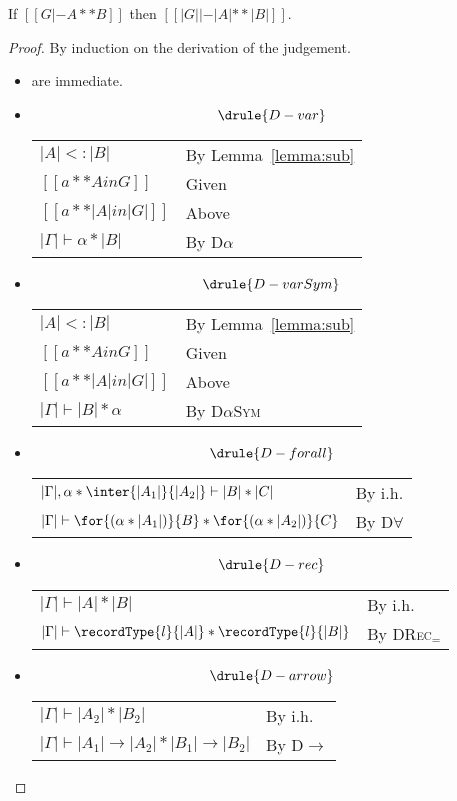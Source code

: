 \begin{lemma} \label{lemma:dis}
  If $[[G |- A ** B]]$ then $[[ |G| |- |A| ** |B| ]]$.
\end{lemma}
\begin{proof}
  By induction on the derivation of the judgement.
  \begin{itemize}
  \item {} are immediate.
  \item \[ \drule{D-var} \]
    \begin{longtable}[l]{ll}
      $|A| <: |B|$ & By Lemma~\ref{lemma:sub} \\
      $[[a ** A in G]]$ & Given \\
      $[[a ** |A| in |G|]]$ & Above \\
      $|\Gamma| \vdash \alpha * |B|$ & By \textsc{D$\alpha$}
    \end{longtable}
  \item \[ \drule{D-varSym} \]
    \begin{longtable}[l]{ll}
      $|A| <: |B|$ & By Lemma~\ref{lemma:sub} \\
      $[[a ** A in G]]$ & Given \\
      $[[a ** |A| in |G|]]$ & Above \\
      $|\Gamma| \vdash |B| * \alpha$ & By \textsc{D$\alpha$Sym}
    \end{longtable}
  \item \[ \drule{D-forall}  \]
    \begin{longtable}[l]{ll}
      $|\Gamma|, \alpha * \inter{|A_1|}{|A_2|} \vdash |B| * |C|$ & By i.h. \\
      $|\Gamma| \vdash \for{(\alpha * |A_1|)}{B} * \for{(\alpha * |A_2|)}{C}$ & By \textsc{D$\forall$}
    \end{longtable}
  \item \[ \drule{D-rec}  \]
    \begin{longtable}[l]{ll}
      $|\Gamma| \vdash |A| * |B| $ & By i.h. \\
      $|\Gamma| \vdash \recordType{l}{|A|} * \recordType{l}{|B|}$ & By \textsc{DRec$_=$}
    \end{longtable}
  \item \[ \drule{D-arrow}  \]
    \begin{longtable}[l]{ll}
      $|\Gamma| \vdash |A_2| * |B_2| $ & By i.h. \\
      $|\Gamma| \vdash |A_1| \rightarrow |A_2| * |B_1| \rightarrow |B_2|$ & By \textsc{D$\rightarrow$}
    \end{longtable}

\end{itemize}
\end{proof}
